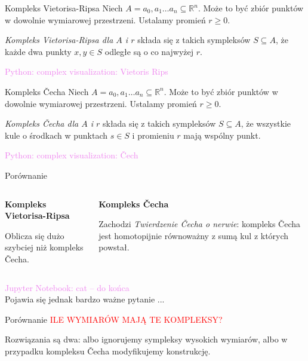 \documentclass{beamer}
\newcommand{\comment}[1]{\textcolor{violet}{#1}}
\begin{document}
\begin{frame}{Kompleks Vietorisa-Ripsa}
  Niech $A={a_0, a_1 \ldots a_n} \subseteq \mathbb{R}^n$.
  Może to być zbiór punktów w dowolnie wymiarowej przestrzeni. 
  Ustalamy promień $r \geq 0$.

  \emph{Kompleks Vietorisa-Ripsa dla $A$ i $r$} składa się z takich sympleksów
  $S\subseteq A$, że każde dwa punkty $x,y \in S$ odległe są o co najwyżej $r$.

  \pause
  \comment{Python: complex visualization: Vietoris Rips}
\end{frame}

\begin{frame}{Kompleks Čecha}
  Niech $A={a_0, a_1 \ldots a_n} \subseteq \mathbb{R}^n$.
  Może to być zbiór punktów w dowolnie wymiarowej przestrzeni. 
  Ustalamy promień $r \geq 0$.

  \emph{Kompleks Čecha dla $A$ i $r$} składa się z takich sympleksów
  $S\subseteq A$, że wszystkie kule o środkach w punktach $s\in S$ i promieniu $r$
  mają wspólny punkt.

  \pause
  \comment{Python: complex visualization: Čech}
\end{frame}

\begin{frame}{Porównanie}
  \begin{columns}[t]
    \pause
    \begin{column}{0.48\textwidth}
      \textbf{Kompleks Vietorisa-Ripsa}\pause

      Oblicza się dużo szybciej niż kompleks Čecha.
      
    \end{column}
    \pause
    \begin{column}{0.48\textwidth}
      \textbf{Kompleks Čecha}\pause

      Zachodzi \emph{Twierdzenie Čecha o nerwie}:
      kompleks Čecha jest homotopijnie równoważny z sumą kul z których powstał.
      
    \end{column}
    
  \end{columns}
  \pause
  \vspace{12pt}
  \comment{Jupyter Notebook: cat -- do końca}\\
  \pause
  \vspace{12pt}
  Pojawia się jednak bardzo ważne pytanie ...
\end{frame}

\begin{frame}{Porównanie}
  {\Huge\textcolor{red}{ILE WYMIARÓW MAJĄ TE KOMPLEKSY?}}
  \pause

  Rozwiązania są dwa: albo ignorujemy sympleksy wysokich wymiarów,
  albo w przypadku kompleksu Čecha modyfikujemy konstrukcję.
\end{frame}
\end{document}
